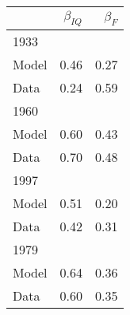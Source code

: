 \begin{tabular}{lrr}
\hline
  & $\beta_{IQ}$  & $\beta_{F}$  \\ 
\hline
1933 &   &   \\ 
Model & 0.46  & 0.27  \\ 
Data & 0.24  & 0.59  \\ 
1960 &   &   \\ 
Model & 0.60  & 0.43  \\ 
Data & 0.70  & 0.48  \\ 
1997 &   &   \\ 
Model & 0.51  & 0.20  \\ 
Data & 0.42  & 0.31  \\ 
1979 &   &   \\ 
Model & 0.64  & 0.36  \\ 
Data & 0.60  & 0.35  \\ 
\hline
\end{tabular}%
